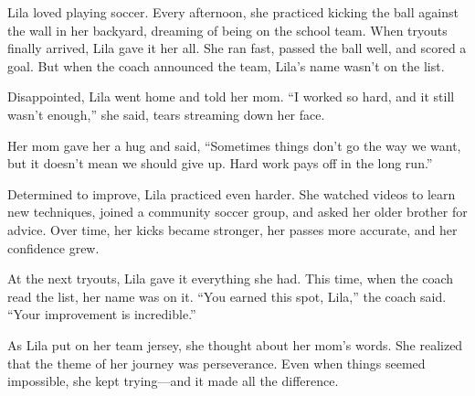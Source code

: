\documentclass[12pt]{article}
\begin{document}
\vspace{1em}
\begin{tcolorbox}[colframe=black!60, colback=white, 
coltitle=black, colbacktitle=black!15, fonttitle=\bfseries\Large, 
title=Lila the Soccer Star, halign title=center, left=10pt, right=10pt, top=10pt, bottom=15pt]


Lila loved playing soccer. Every afternoon, she practiced kicking the ball against the wall in her backyard, dreaming of being on the school team. When tryouts finally arrived, Lila gave it her all. She ran fast, passed the ball well, and scored a goal. But when the coach announced the team, Lila’s name wasn’t on the list.

Disappointed, Lila went home and told her mom. “I worked so hard, and it still wasn’t enough,” she said, tears streaming down her face.

Her mom gave her a hug and said, “Sometimes things don’t go the way we want, but it doesn’t mean we should give up. Hard work pays off in the long run.”

Determined to improve, Lila practiced even harder. She watched videos to learn new techniques, joined a community soccer group, and asked her older brother for advice. Over time, her kicks became stronger, her passes more accurate, and her confidence grew.

At the next tryouts, Lila gave it everything she had. This time, when the coach read the list, her name was on it. “You earned this spot, Lila,” the coach said. “Your improvement is incredible.”

As Lila put on her team jersey, she thought about her mom’s words. She realized that the theme of her journey was perseverance. Even when things seemed impossible, she kept trying—and it made all the difference.

 
\end{tcolorbox}
\end{document}

